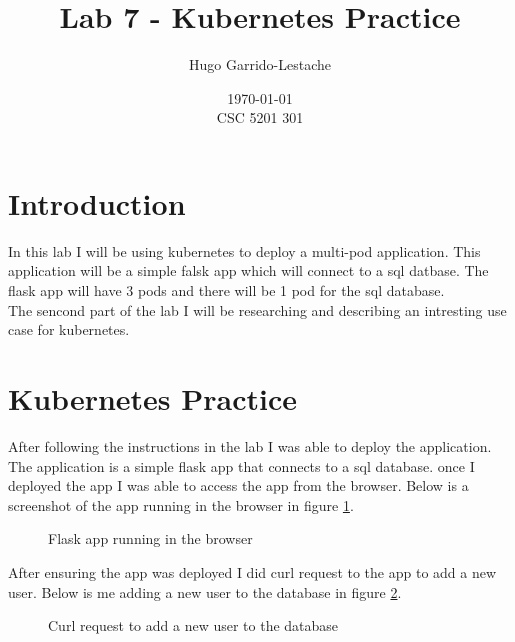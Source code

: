 \documentclass[12pt]{Article}
\title{Lab 7 - Kubernetes Practice}
\author{
    Hugo Garrido-Lestache
}
\date{\today \\ CSC 5201 301}
\begin{document}
\maketitle
\section*{Introduction}
In this lab I will be using kubernetes to deploy a multi-pod application.
This application will be a simple falsk app which will connect to a sql datbase.
The flask app will have 3 pods and there will be 1 pod for the sql database.
\\
The sencond part of the lab I will be researching and describing an intresting use case for kubernetes.

\section{Kubernetes Practice}
After following the instructions in the lab I was able to deploy the application.
The application is a simple flask app that connects to a sql database.
once I deployed the app I was able to access the app from the browser.
Below is a screenshot of the app running in the browser in figure \ref{fig:app}.

\begin{figure}[H]
    \centering
    \caption{Flask app running in the browser}
    \label{fig:app}
\end{figure}

After ensuring the app was deployed I did curl request to the app to add a new user.
Below is me adding a new user to the database in figure \ref{fig:curl}.

\begin{figure}[H]
    \centering
    \caption{Curl request to add a new user to the database}
    \label{fig:curl}
\end{figure}
\end{document}
